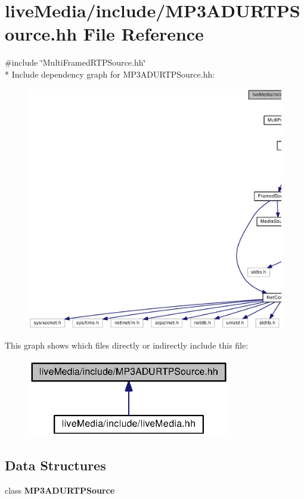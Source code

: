 \section{live\+Media/include/\+M\+P3\+A\+D\+U\+R\+T\+P\+Source.hh File Reference}
\label{MP3ADURTPSource_8hh}
{\ttfamily \#include \char`\"{}Multi\+Framed\+R\+T\+P\+Source.\+hh\char`\"{}}\\*
Include dependency graph for M\+P3\+A\+D\+U\+R\+T\+P\+Source.\+hh\+:
\nopagebreak
\begin{figure}[H]
\begin{center}
\leavevmode
\includegraphics[width=350pt]{MP3ADURTPSource_8hh__incl}
\end{center}
\end{figure}
This graph shows which files directly or indirectly include this file\+:
\nopagebreak
\begin{figure}[H]
\begin{center}
\leavevmode
\includegraphics[width=252pt]{MP3ADURTPSource_8hh__dep__incl}
\end{center}
\end{figure}
\subsection*{Data Structures}
\begin{DoxyCompactItemize}
\item 
class {\bf M\+P3\+A\+D\+U\+R\+T\+P\+Source}
\end{DoxyCompactItemize}
